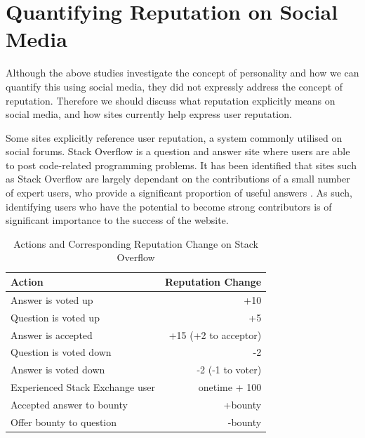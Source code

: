 \section{Quantifying Reputation on Social Media}


Although the above studies investigate the concept of personality and how we can quantify this using social media, they did not expressly address the concept of reputation. Therefore we should discuss what reputation explicitly means on social media, and how sites currently help express user reputation. 

Some sites explicitly reference user reputation, a system commonly utilised on social forums. Stack Overflow \cite{stackoverflow_site} is a question and answer site where users are able to post code-related programming problems. It has been identified that sites such as Stack Overflow are largely dependant on the contributions of a small number of expert users, who provide a significant proportion of useful answers \cite{movshovitzanalysis}. As such, identifying users who have the potential to become strong contributors is of significant importance to the success of the website.

\begin{table}[h!]
\begin{center}
\begin{tabular}{l|r}
 Action & Reputation Change\\ \hline
 Answer is voted up & +10 \\
 Question is voted up & +5 \\
 Answer is accepted & +15 (+2 to acceptor) \\
 Question is voted down & -2 \\
 Answer is voted down & -2 (-1 to voter) \\
 Experienced Stack Exchange user & onetime + 100 \\
 Accepted answer to bounty & +bounty \\
 Offer bounty to question & -bounty \\ 
\end{tabular}
\end{center}
\caption{Actions and Corresponding Reputation Change on Stack Overflow \cite{movshovitzanalysis}}
\label{tab:STACK}
\end{table}

